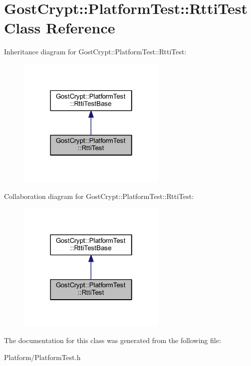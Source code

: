\hypertarget{class_gost_crypt_1_1_platform_test_1_1_rtti_test}{}\section{Gost\+Crypt\+:\+:Platform\+Test\+:\+:Rtti\+Test Class Reference}
\label{class_gost_crypt_1_1_platform_test_1_1_rtti_test}


Inheritance diagram for Gost\+Crypt\+:\+:Platform\+Test\+:\+:Rtti\+Test\+:
\nopagebreak
\begin{figure}[H]
\begin{center}
\leavevmode
\includegraphics[width=202pt]{class_gost_crypt_1_1_platform_test_1_1_rtti_test__inherit__graph}
\end{center}
\end{figure}


Collaboration diagram for Gost\+Crypt\+:\+:Platform\+Test\+:\+:Rtti\+Test\+:
\nopagebreak
\begin{figure}[H]
\begin{center}
\leavevmode
\includegraphics[width=202pt]{class_gost_crypt_1_1_platform_test_1_1_rtti_test__coll__graph}
\end{center}
\end{figure}


The documentation for this class was generated from the following file\+:\begin{DoxyCompactItemize}
\item 
Platform/Platform\+Test.\+h\end{DoxyCompactItemize}
